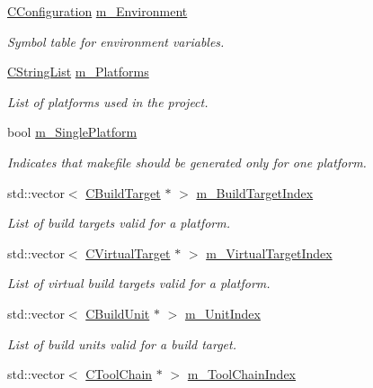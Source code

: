 \begin{DoxyCompactItemize}
\hyperlink{classCConfiguration}{C\-Configuration} \hyperlink{classCCodeBlocksProject_a2abc20327d98c940a5a6315e2b6278cf}{m\-\_\-\-Environment}
\begin{DoxyCompactList}\small\item\em Symbol table for environment variables. \end{DoxyCompactList}\item 
\hyperlink{classCStringList}{C\-String\-List} \hyperlink{classCCodeBlocksProject_a02182ff5699ad56dec022a0061a883b8}{m\-\_\-\-Platforms}
\begin{DoxyCompactList}\small\item\em List of platforms used in the project. \end{DoxyCompactList}\item 
bool \hyperlink{classCCodeBlocksProject_ae22325c0669ffa1e9a6c3db15135a7b1}{m\-\_\-\-Single\-Platform}
\begin{DoxyCompactList}\small\item\em Indicates that makefile should be generated only for one platform. \end{DoxyCompactList}\item 
std\-::vector$<$ \hyperlink{classCBuildTarget}{C\-Build\-Target} $\ast$ $>$ \hyperlink{classCCodeBlocksProject_a7fc0903a694170fb8d3de2e62a788097}{m\-\_\-\-Build\-Target\-Index}
\begin{DoxyCompactList}\small\item\em List of build targets valid for a platform. \end{DoxyCompactList}\item 
std\-::vector$<$ \hyperlink{classCVirtualTarget}{C\-Virtual\-Target} $\ast$ $>$ \hyperlink{classCCodeBlocksProject_accfc0de789f0443a8bc5ec4dc8a409bd}{m\-\_\-\-Virtual\-Target\-Index}
\begin{DoxyCompactList}\small\item\em List of virtual build targets valid for a platform. \end{DoxyCompactList}\item 
std\-::vector$<$ \hyperlink{classCBuildUnit}{C\-Build\-Unit} $\ast$ $>$ \hyperlink{classCCodeBlocksProject_a40ff58ecb0e82fcd2778053321323fbe}{m\-\_\-\-Unit\-Index}
\begin{DoxyCompactList}\small\item\em List of build units valid for a build target. \end{DoxyCompactList}\item 
std\-::vector$<$ \hyperlink{classCToolChain}{C\-Tool\-Chain} $\ast$ $>$ \hyperlink{classCCodeBlocksProject_a90848c1fb72d0e0f15ec3e402f7d64ff}{m\-\_\-\-Tool\-Chain\-Index}

\end{DoxyCompactItemize}
